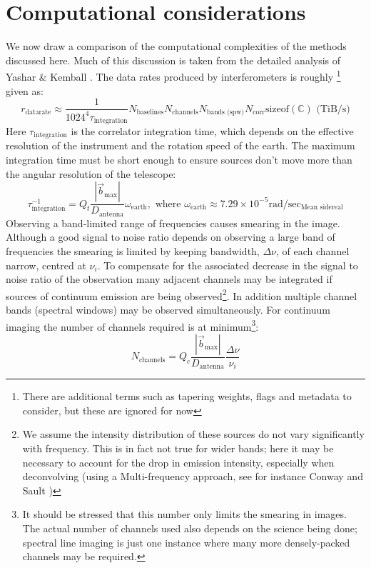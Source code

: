 \section{Computational considerations}
We now draw a comparison of the computational complexities of the methods discussed here. Much of this discussion is taken from the detailed analysis of 
Yashar \& Kemball \cite{yashar2009tdp}.
The data rates produced by interferometers is roughly \footnote{There are additional terms such as tapering weights, flags and metadata to consider, but these are ignored for now} given as:
\begin{equation}
 r_\text{datarate} \approx \frac{1}{1024^4\tau_{\text{integration}}}N_{\text{baselines}}N_{\text{channels}}N_{\text{bands (spw)}}N_{\text{corr}}\text{sizeof}(\mathbb{C})\text{ (TiB/s)}
\end{equation}
Here $\tau_{\text{integration}}$ is the correlator integration time, which depends on the effective resolution of the instrument and the rotation speed of the earth.
The maximum integration time must be short enough to ensure sources don't move more than the angular resolution of the telescope:
\begin{equation}
 \tau_{\text{integration}}^{-1} = Q_t\frac{|\vec{b}_{\text{max}}|}{D_{\text{antenna}}}\omega_\text{earth},\text{ where } \omega_\text{earth}\approx 7.29\times10^{-5}\text{rad}/\text{sec}_\text{Mean sidereal}
\end{equation}
Observing a band-limited range of frequencies causes smearing in the image. Although a good signal to noise ratio depends on observing a large band of frequencies the smearing is limited
by keeping bandwidth, $\Delta\nu$, of each channel narrow, centred at $\nu_i$. To compensate for the associated decrease in the signal to noise ratio of the observation many adjacent channels may be integrated if 
sources of continuum emission are being observed\footnote{We assume the intensity distribution of these sources do not vary significantly with frequency. This is in fact not true for wider bands; here 
it may be necessary to account for the drop in emission intensity, especially when deconvolving (using a Multi-frequency approach, see for instance Conway and Sault \cite[Lecture 21]{taylor1999synthesis})}. In addition 
multiple channel bands (spectral windows) may be observed simultaneously. For continuum imaging the number of channels required is at minimum\footnote{It should 
be stressed that this number only limits the smearing in images. The actual number of channels used also depends on the science being done; spectral line imaging is just one instance where many more 
densely-packed channels may be required.}:
\begin{equation}
 N_{\text{channels}} = Q_c\frac{|\vec{b}_{\text{max}}|}{D_{\text{antenna}}}\frac{\Delta{\nu}}{\nu_i}
\end{equation}

